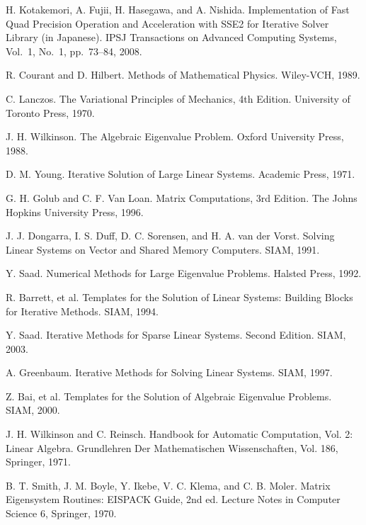 \documentclass[a4paper]{jarticle}
\begin{document}
{\begin{thebibliography}{10}
H. Kotakemori, A. Fujii, H. Hasegawa, and A. Nishida.
\newblock Implementation of Fast Quad Precision Operation and
	Acceleration with SSE2 for Iterative Solver Library (in
	Japanese).
\newblock IPSJ Transactions on Advanced Computing Systems,  Vol.~1, No.~1, pp.\ 73--84, 2008.

R. Courant and D. Hilbert.
\newblock Methods of Mathematical Physics. 
\newblock Wiley-VCH, 1989.

C. Lanczos. 
\newblock The Variational Principles of Mechanics, 4th Edition. 
\newblock University of Toronto Press, 1970.

J. H. Wilkinson. 
\newblock The Algebraic Eigenvalue Problem. 
\newblock Oxford University Press, 1988.

D. M. Young. 
\newblock Iterative Solution of Large Linear Systems. 
\newblock Academic Press, 1971.

G. H. Golub and C. F. Van Loan.
\newblock Matrix Computations, 3rd Edition.
\newblock The Johns Hopkins University Press, 1996.

J. J. Dongarra, I. S. Duff, D. C. Sorensen, and H. A. van der Vorst.
\newblock Solving Linear Systems on Vector and Shared Memory Computers.
\newblock SIAM, 1991.

Y. Saad.
\newblock Numerical Methods for Large Eigenvalue Problems. 
\newblock Halsted Press, 1992.

R. Barrett, et al.
\newblock Templates for the Solution of Linear Systems: Building Blocks for Iterative Methods.
\newblock SIAM, 1994.

Y. Saad.
\newblock Iterative Methods for Sparse Linear Systems. Second Edition. 
\newblock SIAM, 2003.

A. Greenbaum.
\newblock Iterative Methods for Solving Linear Systems.
\newblock SIAM, 1997.

Z. Bai, et al.
\newblock Templates for the Solution of Algebraic Eigenvalue Problems. 
\newblock SIAM, 2000.

J. H. Wilkinson and C. Reinsch.
\newblock Handbook for Automatic Computation, Vol. 2: Linear Algebra.
\newblock Grundlehren Der Mathematischen Wissenschaften, Vol. 186, Springer, 1971.

B. T. Smith, J. M. Boyle, Y. Ikebe, V. C. Klema, and C. B. Moler.
\newblock Matrix Eigensystem Routines: EISPACK Guide, 2nd ed.
\newblock Lecture Notes in Computer Science 6, Springer, 1970.


\end{thebibliography}}
\end{document}
